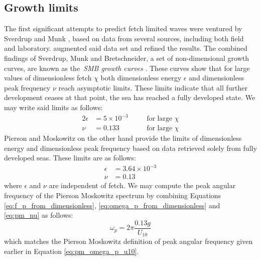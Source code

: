 \subsection{Growth limits}
%
The first significant attempts to predict fetch limited waves were ventured by
Sverdrup and Munk \citep{book:breakersandsurf1944,book:breakersandsurfsupplement1945},
based on data from several sources, including both field and laboratory.
\citet{article:Bretschneider1952} augmented said data set and refined the 
results. The combined findings of Sverdrup, Munk and Bretschneider, a set of 
non-dimensional growth curves, are known as the~\emph{SMB growth curves}
\citep{book:cerc1977}. These curves show that for large values of dimensionless 
fetch $\chi$ both dimensionless energy $\epsilon$ and dimensionless peak 
frequency $\nu$ reach asymptotic limits. These limits indicate that all further 
development ceases at that point, the sea has reached a fully developed state. 
We may write said limits as follows:
\begin{alignat}{2}
 \epsilon &= 5\times10^{-3} \quad && \text{for large } \chi \\
 \nu &= 0.133 \quad && \text{for large } \chi
\end{alignat}
Pierson and Moskowitz on the other hand provide the limits of dimensionless 
energy and dimensionless peak frequency based on data retrieved solely from 
fully developed seas. These limits are as follows:
\begin{align}
 \epsilon &= 3.64\times10^{-3} \\
 \nu &= 0.13 \label{eq:pm_nu}
\end{align}
where $\epsilon$ and $\nu$ are independent of fetch. We may compute the peak
angular frequency of the Pierson Moskowitz spectrum by combining Equations
\ref{eq:f_p_from_dimensionless}, \ref{eq:omega_p_from_dimensionless} and
\ref{eq:pm_nu} as follows:
\begin{equation}
 \omega_p = 2\pi\frac{0.13g}{U_{10}}
\end{equation}
which matches the Pierson Moskowitz definition of peak angular frequency
given earlier in Equation \ref{eq:pm_omega_p_u10}.\\

